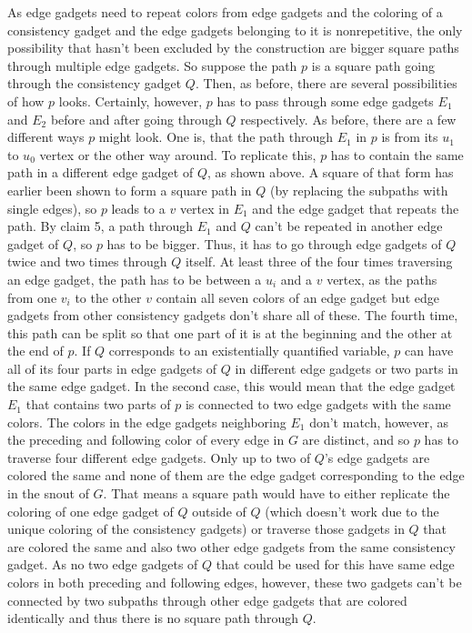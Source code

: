 \documentclass[12pt,a4paper]{article}
\begin{document}
As edge gadgets need to repeat colors from edge gadgets and the coloring of a consistency gadget and the edge gadgets belonging to it is nonrepetitive, the only possibility that hasn't been excluded by the construction are bigger square paths through multiple edge gadgets. So suppose the path $p$ is a square path going through the consistency gadget $Q$. Then, as before, there are several possibilities of how $p$ looks. Certainly, however, $p$ has to pass through some edge gadgets $E_1$ and $E_2$ before and after going through $Q$ respectively. 
\newline
As before, there are a few different ways $p$ might look. One is, that the path through $E_1$ in $p$ is from its $u_1$ to $u_0$ vertex or the other way around. To replicate this, $p$ has to contain the same path in a different edge gadget of $Q$, as shown above. A square of that form has earlier been shown to form a square path in $Q$ (by replacing the subpaths with single edges), so $p$ leads to a $v$ vertex in $E_1$ and the edge gadget that repeats the path. By claim 5, a path through $E_1$ and $Q$ can't be repeated in another edge gadget of $Q$, so $p$ has to be bigger. Thus, it has to go through edge gadgets of $Q$ twice and two times through $Q$ itself. At least three of the four times traversing an edge gadget, the path has to be between a $u_i$ and a $v$ vertex, as the paths from one $v_i$ to the other $v$ contain all seven colors of an edge gadget but edge gadgets from other consistency gadgets don't share all of these. The fourth time, this path can be split so that one part of it is at the beginning and the other at the end of $p$.
\newline
If $Q$ corresponds to an existentially quantified variable, $p$ can have all of its four parts in edge gadgets of $Q$ in different edge gadgets or two parts in the same edge gadget. In the second case, this would mean that the edge gadget $E_1$ that contains two parts of $p$ is connected to two edge gadgets with the same colors. The colors in the edge gadgets neighboring $E_1$ don't match, however, as the preceding and following color of every edge in $G$ are distinct, and so $p$ has to traverse four different edge gadgets. Only up to two of $Q$'s edge gadgets are colored the same and none of them are the edge gadget corresponding to the edge in the snout of $G$. That means a square path would have to either replicate the coloring of one edge gadget of $Q$ outside of $Q$ (which doesn't work due to the unique coloring of the consistency gadgets) or traverse those gadgets in $Q$ that are colored the same and also two other edge gadgets from the same consistency gadget. As no two edge gadgets of $Q$ that could be used for this have same edge colors in both preceding and following edges, however, these two gadgets can't be connected by two subpaths through other edge gadgets that are colored identically and thus there is no square path through $Q$.
\end{document}
